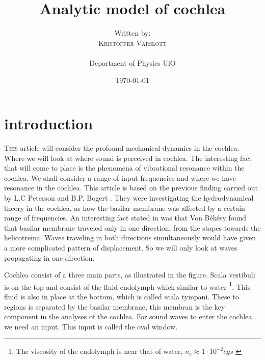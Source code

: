 \documentclass[twoside,twocolumn]{article}
\title{Analytic model of cochlea}%
\author{%
\normalsize{Written by}:\\	 	
\textsc{Kristoffer Varslott} \\\\
\normalsize {Department of Physics UiO}
}
\date{\today} %
\begin{document}
\maketitle



\section{introduction}
\lettrine[nindent=0em,lines=2]{T}{his} article will consider the profound mechanical dynamics in the cochlea. Where we will look at where sound is perceived in cochlea. The interesting fact  that will come to place is the phenomena of vibrational resonance within the cochlea. We shall consider a range of input frequencies and where we have resonance in the cochlea. This article is based on the previous finding carried out by L.C Peterson and B.P. Bogert \cite{Peterson2005}. They were investigating the hydrodynamical theory in the cochlea, as how the basilar membrane was affected by a certain range of frequencies. An interesting fact stated in \cite{Zweig1976} was that Von Békésy found that basilar membrane traveled only in one direction, from the stapes towards the helicotrema. Waves traveling in both directions simultaneously would have given a more complicated pattern of displacement. So we will only look at waves propagating in one direction. 

\bigskip 

Cochlea consist of a three main parts, as illustrated in the figure. Scala vestibuli is on the top and consist of the fluid endolymph which similar to water \footnote{The viscosity of the endolymph is near that of water,  $n_e \approx 1 \cdot 10^{-2} cgs$ \cite{Zwislocki1980}}. This fluid is also in place at the bottom, which is called scala tympani. These to regions is separated by the basilar membrane, this membran is the key component in the analyses of the cochlea. For sound waves to enter the cochlea we need an input. This input is called the oval window. 
\end{document}

